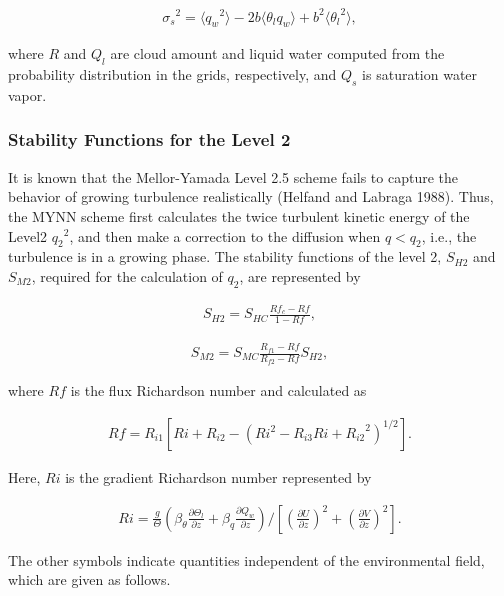 \begin{eqnarray}{\sigma_s}^2=\langle {q_w}^2 \rangle -2b \langle \theta_l q_w \rangle + b^2\langle {\theta_l}^2 \rangle,\end{eqnarray}

where \(R\) and \(Q_l\) are cloud amount and liquid water computed from the probability distribution in the grids, respectively, and \(Q_s\) is saturation water vapor.

\hypertarget{stability-functions-for-the-level-2}{%
\subsubsection{Stability Functions for the Level 2}\label{stability-functions-for-the-level-2}}

It is known that the Mellor-Yamada Level 2.5 scheme fails to capture the behavior of growing turbulence realistically (Helfand and Labraga 1988). Thus, the MYNN scheme first calculates the twice
turbulent kinetic energy of the Level2 \({q_2}^2\), and then make a correction to the diffusion when \(q<q_2\), i.e., the turbulence is in a growing phase. The stability functions of the level 2,
\(S_{H2}\) and \(S_{M2}\), required for the calculation of \(q_2\), are represented by

\begin{eqnarray}S_{H2}=S_{HC}\frac{Rf_c-Rf}{1-Rf},\end{eqnarray}

\begin{eqnarray}S_{M2}=S_{MC}\frac{R_{f1}-Rf}{R_{f2}-Rf}S_{H2},\end{eqnarray}

where \(Rf\) is the flux Richardson number and calculated as

\begin{eqnarray}Rf=R_{i1}\left[Ri+R_{i2}-(Ri^2-R_{i3}Ri+{R_{i2}}^2)^{1/2}\right].\end{eqnarray}

Here, \(Ri\) is the gradient Richardson number represented by

\begin{eqnarray}Ri=\frac{g}{\Theta}\left(\beta_\theta \frac{\partial \Theta_l}{\partial z}+\beta_q \frac{\partial Q_w}{\partial z}\right) \Bigg/ \left[ \left(\frac{\partial U}{\partial z}\right)^2+\left(\frac{\partial V}{\partial z}\right)^2 \right].\end{eqnarray}

The other symbols indicate quantities independent of the environmental field, which are given as follows.

